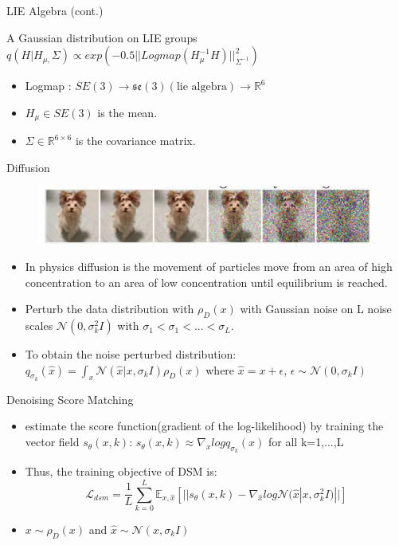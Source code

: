 \documentclass{beamer}
\begin{document}
\begin{frame}{LIE Algebra (cont.)}
\begin{block}{A Gaussian distribution on LIE groups}
$q(H|H_{\mu,} \Sigma) \propto exp(-0.5 ||Logmap(H^{-1}_{\mu} H)||^2_{\Sigma^{-1}})$
\end{block}
\begin{itemize}
    \item Logmap : $SE(3) \rightarrow \mathfrak{se}(3)(\text{lie algebra}) \rightarrow \mathbb{R}^6$
    \item $H_\mu \in SE(3)$ is the mean.
    \item $\Sigma \in \mathbb{R}^{6 \times 6}$ is the covariance matrix.
\end{itemize}
\end{frame}


\begin{frame}{Diffusion}
\begin{figure}
\includegraphics[width=0.8\linewidth]{diffusion_forward.png}
\end{figure}
\begin{itemize}
\item In physics diffusion is the movement of particles move from an area of high concentration to an area of low concentration until equilibrium is reached.
\item Perturb the data distribution with $\rho_D(x)$ with Gaussian noise on L noise scales $\mathcal{N}(0, \sigma^2_kI)$ with $\sigma_1 < \sigma_1 < ... < \sigma_L$.
\item To obtain the noise perturbed distribution: $q_{\sigma_k}(\hat{x})=\int_x \mathcal{N}(\hat{x}|x,\sigma_kI)\rho_D(x)$ where $\hat{x}=x+\epsilon$, $\epsilon \sim \mathcal{N}(0,\sigma_kI)$
\end{itemize}
\end{frame}



\begin{frame}{Denoising Score Matching}
\begin{itemize}
\item estimate the score function(gradient of the log-likelihood) by training the vector field $s_\theta(x,k)$: $s_\theta(x,k) \approx \nabla_x log q_{\sigma_k}(x)$ for all k=1,...,L 
\item Thus, the training objective of DSM is: 
\[ \mathcal{L}_{dsm}=\frac{1}{L} \sum_{k=0}^{L} \mathbb{E}_{x,\hat{x}}[|| s_\theta(x,k) - \nabla_{\hat{x}} log\mathcal{N}(\hat{x}| x, \sigma^2_kI)||] \]
\item $x \sim \rho_D(x)$ and $\hat{x} \sim \mathcal{N}(x, \sigma_k I)$
\end{itemize}
\end{frame}
\end{document}
